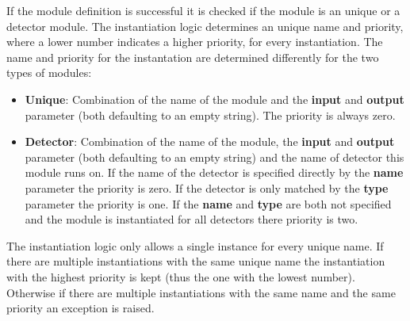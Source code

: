 If the module definition is successful it is checked if the module is an unique or a detector module. The instantiation logic determines an unique name and priority, where a lower number indicates a higher priority, for every instantiation. The name and priority for the instantation are determined differently for the two types of modules:
\begin{itemize}
\item \textbf{Unique}: Combination of the name of the module and the \textbf{input} and \textbf{output} parameter (both defaulting to an empty string). The priority is always zero.
\item \textbf{Detector}: Combination of the name of the module, the \textbf{input} and \textbf{output} parameter (both defaulting to an empty string) and the name of detector this module runs on. If the name of the detector is specified directly by the \textbf{name} parameter the priority is zero. If the detector is only matched by the \textbf{type} parameter the priority is one. If the \textbf{name} and \textbf{type} are both not specified and the module is instantiated for all detectors there priority is two.
\end{itemize}
The instantiation logic only allows a single instance for every unique name. If there are multiple instantiations with the same unique name the instantiation with the highest priority is kept (thus the one with the lowest number). Otherwise if there are multiple instantiations with the same name and the same priority an exception is raised.


